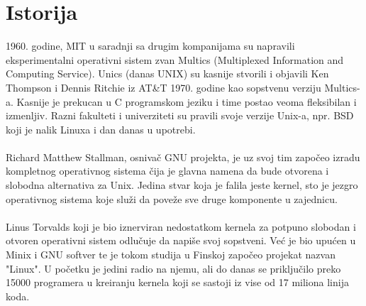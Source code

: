 \documentclass[a4paper,14pt]{article}
\begin{document}
\section{Istorija}
1960. godine, MIT u saradnji sa drugim kompanijama su napravili eksperimentalni operativni sistem zvan Multics (Multiplexed Information and Computing Service). Unics (danas UNIX) su kasnije stvorili i objavili Ken Thompson i Dennis Ritchie iz AT\&T 1970. godine kao sopstvenu verziju Multics-a. Kasnije je prekucan u C programskom jeziku i time postao veoma fleksibilan i izmenljiv. Razni fakulteti i univerziteti su pravili svoje verzije Unix-a, npr. BSD koji je nalik Linuxa i dan danas u upotrebi.
\\\\
Richard Matthew Stallman, osnivač GNU projekta, je uz svoj tim započeo izradu kompletnog operativnog sistema čija je glavna namena da bude otvorena i slobodna alternativa za Unix. Jedina stvar koja je falila jeste kernel, sto je jezgro operativnog sistema koje služi da poveže sve druge komponente u zajednicu.
\\\\
Linus Torvalds koji je bio iznerviran nedostatkom kernela za potpuno slobodan i otvoren operativni sistem odlučuje da napiše svoj sopstveni. Već je bio upućen u Minix i GNU softver te je tokom studija u Finskoj započeo projekat nazvan "Linux". U početku je jedini radio na njemu, ali do danas se priključilo preko 15000 programera u kreiranju kernela koji se sastoji iz vise od 17 miliona linija koda.
\\\\
\begin{figure}[h]
	\centering
    \hspace{1cm}
\end{figure}
\end{document}
